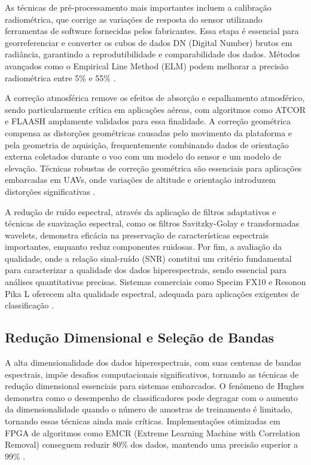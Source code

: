 As técnicas de pré-processamento mais importantes incluem a calibração
radiométrica, que corrige as variações de resposta do sensor utilizando
ferramentas de software fornecidas pelos fabricantes. Essa etapa é
essencial para georreferenciar e converter os cubos de dados DN (Digital
Number) brutos em radiância, garantindo a reprodutibilidade e
comparabilidade dos dados. Métodos avançados como o Empirical Line Method
(ELM) podem melhorar a precisão radiométrica entre 5\% e 55\%
\cite{SilvaSantos2024}.

A correção atmosférica remove os efeitos de absorção e espalhamento
atmosférico, sendo particularmente crítica em aplicações aéreas, com
algoritmos como ATCOR e FLAASH amplamente validados para essa finalidade.
A correção geométrica compensa as distorções geométricas causadas pelo
movimento da plataforma e pela geometria de aquisição, frequentemente
combinando dados de orientação externa coletados durante o voo com um
modelo do sensor e um modelo de elevação. Técnicas robustas de correção
geométrica são essenciais para aplicações embarcadas em UAVs, onde
variações de altitude e orientação introduzem distorções significativas
\cite{SilvaSantos2024}.

A redução de ruído espectral, através da aplicação de filtros adaptativos
e técnicas de suavização espectral, como os filtros Savitzky-Golay e
transformadas wavelets, demonstra eficácia na preservação de
características espectrais importantes, enquanto reduz componentes ruidosas.
Por fim, a avaliação da qualidade, onde a relação sinal-ruído (SNR)
constitui um critério fundamental para caracterizar a qualidade dos dados
hiperespectrais, sendo essencial para análises quantitativas precisas.
Sistemas comerciais como Specim FX10 e Resonon Pika L oferecem alta
qualidade espectral, adequada para aplicações exigentes de classificação
\cite{Zhang2024}.

\subsection{Redução Dimensional e Seleção de Bandas}
\label{subsec:reducao_dimensional}

A alta dimensionalidade dos dados hiperespectrais, com suas centenas de
bandas espectrais, impõe desafios computacionais significativos, tornando
as técnicas de redução dimensional essenciais para sistemas embarcados. O
fenômeno de Hughes demonstra como o desempenho de classificadores pode
degragar com o aumento da dimensionalidade quando o número de amostras de
treinamento é limitado, tornando essas técnicas ainda mais críticas.
Implementações otimizadas em FPGA de algoritmos como EMCR (Extreme Learning
Machine with Correlation Removal) conseguem reduzir 80\% dos dados,
mantendo uma precisão superior a 99\% \cite{Martins2019}.

